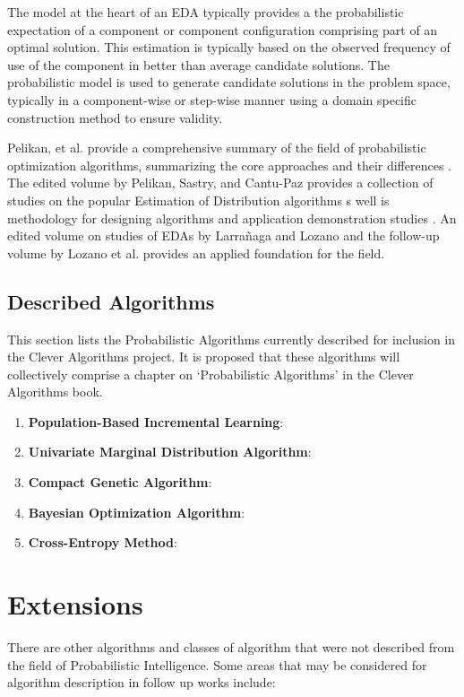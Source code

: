\documentclass[a4paper, 11pt]{article}
\begin{document}
The model at the heart of an EDA typically provides a the probabilistic expectation of a component or component configuration comprising part of an optimal solution. This estimation is typically based on the observed frequency of use of the component in better than average candidate solutions. The probabilistic model is used to generate candidate solutions in the problem space, typically in a component-wise or step-wise manner using a domain specific construction method to ensure validity.

Pelikan, et al. provide a comprehensive summary of the field of probabilistic optimization algorithms, summarizing the core approaches and their differences \cite{Pelikan2002b}.
The edited volume by Pelikan, Sastry, and Cantu-Paz provides a collection of studies on the popular Estimation of Distribution algorithms s well is methodology for designing algorithms and application demonstration studies \cite{Pelikan2006}.
An edited volume on studies of EDAs by Larrañaga and Lozano \cite{Larranaga2002} and the follow-up volume by Lozano et al. \cite{Lozano2006}  provides an applied foundation for the field.


% 
% 
\subsection{Described Algorithms}
\label{subsec:algorithms}
This section lists the Probabilistic Algorithms currently described for inclusion in the Clever Algorithms project. It is proposed that these algorithms will collectively comprise a chapter on `Probabilistic Algorithms' in the Clever Algorithms book. 

\begin{enumerate}
	\item \textbf{Population-Based Incremental Learning}: \cite{Brownlee2010ap}
	\item \textbf{Univariate Marginal Distribution Algorithm}: \cite{Brownlee2010aq}
	\item \textbf{Compact Genetic Algorithm}: \cite{Brownlee2010ar}
	\item \textbf{Bayesian Optimization Algorithm}: \cite{Brownlee2010as}
	\item \textbf{Cross-Entropy Method}: \cite{Brownlee2010at}
\end{enumerate}

% 
% 
\section{Extensions}
\label{sec:extensions}
There are other algorithms and classes of algorithm that were not described from the field of Probabilistic Intelligence. Some areas that may be considered for algorithm description in follow up works include:
\end{document}
